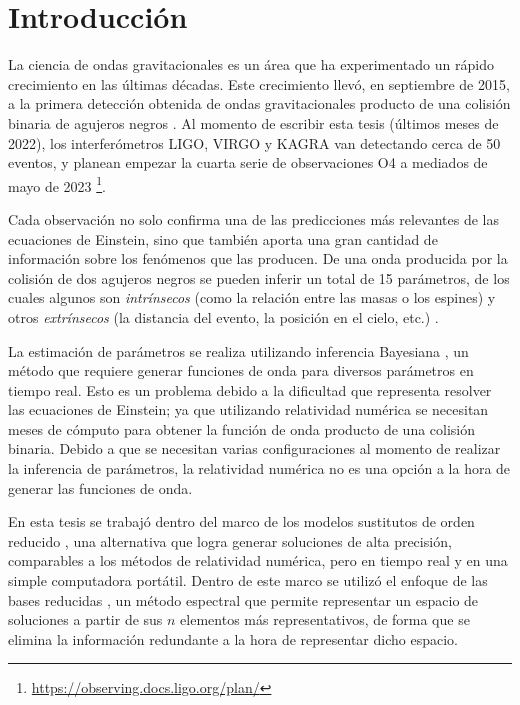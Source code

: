 \chapter{Introducción}

 
La ciencia de ondas gravitacionales es un área que ha experimentado un rápido crecimiento en las últimas décadas. Este crecimiento llevó, en septiembre de 2015, a la primera detección obtenida de ondas gravitacionales producto de una colisión binaria de agujeros negros \cite{https://doi.org/10.48550/arxiv.1607.05251, LIGOScientific:2016aoc}. Al momento de escribir esta tesis (últimos meses de 2022), los interferómetros LIGO, VIRGO y KAGRA van detectando cerca de 50 eventos, y planean empezar la cuarta serie de observaciones O4 a mediados de mayo de 2023 \footnote{\url{https://observing.docs.ligo.org/plan/}}.


Cada observación no solo confirma una de las predicciones más relevantes de las ecuaciones de Einstein, sino que también aporta una gran cantidad de información sobre los fenómenos que las producen. De una onda producida por la colisión de dos agujeros negros se pueden inferir un total de 15 parámetros, de los cuales algunos son \textit{intrínsecos} (como la relación entre las masas o los espines) y otros \textit{extrínsecos} (la distancia del evento, la posición en el cielo, etc.) \cite{Veitch_2015}.


La estimación de parámetros se realiza utilizando inferencia Bayesiana \cite{Thrane_2019}, un método que requiere generar funciones de onda para diversos parámetros en tiempo real. Esto es un problema debido a la dificultad que representa resolver las ecuaciones de Einstein; ya que utilizando relatividad numérica se necesitan meses de cómputo para obtener la función de onda producto de una colisión binaria. Debido a que se necesitan varias configuraciones al momento de realizar la inferencia de parámetros, la relatividad numérica no es una opción a la hora de generar las funciones de onda. 

En esta tesis se trabajó dentro del marco de los modelos sustitutos de orden reducido \cite{Field_2014, Tiglio:2021ysj}, una alternativa que logra generar soluciones de alta precisión, comparables a los métodos de relatividad numérica, pero en tiempo real y en una simple computadora portátil. Dentro de este marco se utilizó el enfoque de las bases reducidas \cite{rb0book, doi:10.1137/09075250X, PhysRevLett.106.221102, 10.1115/1.1448332, rb1book}, un método espectral que permite representar un espacio de soluciones a partir de sus $n$ elementos más representativos, de forma que se elimina la información redundante a la hora de representar dicho espacio.



